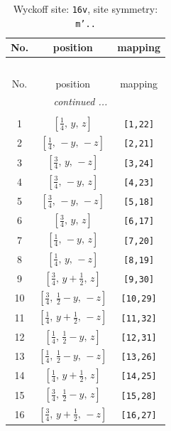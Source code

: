 \documentclass[fleqn,8pt]{jsarticle}
\begin{document}
\renewcommand{\arraystretch}{1.2}
\begin{longtable}{ccc}
\caption{Wyckoff site: {\tt 16v}, site symmetry: {\tt m'..}}
 \\
 \hline \hline
No. & position & mapping \\ \hline \endfirsthead

\multicolumn{2}{l}{\tablename\ \thetable{}} \\
 \hline \hline
No. & position & mapping \\ \hline \endhead

 \hline \hline
\multicolumn{2}{r}{\footnotesize\it continued ...} \\ \endfoot

 \hline \hline
\multicolumn{2}{r}{} \\ \endlastfoot

1 & $\left[ \frac{1}{4},\, y,\, z \right]$ & {\tt [1,22]} \\ \hline
2 & $\left[ \frac{1}{4},\, - y,\, - z \right]$ & {\tt [2,21]} \\ \hline
3 & $\left[ \frac{3}{4},\, y,\, - z \right]$ & {\tt [3,24]} \\ \hline
4 & $\left[ \frac{3}{4},\, - y,\, z \right]$ & {\tt [4,23]} \\ \hline
5 & $\left[ \frac{3}{4},\, - y,\, - z \right]$ & {\tt [5,18]} \\ \hline
6 & $\left[ \frac{3}{4},\, y,\, z \right]$ & {\tt [6,17]} \\ \hline
7 & $\left[ \frac{1}{4},\, - y,\, z \right]$ & {\tt [7,20]} \\ \hline
8 & $\left[ \frac{1}{4},\, y,\, - z \right]$ & {\tt [8,19]} \\ \hline
9 & $\left[ \frac{3}{4},\, y + \frac{1}{2},\, z \right]$ & {\tt [9,30]} \\ \hline
10 & $\left[ \frac{3}{4},\, \frac{1}{2} - y,\, - z \right]$ & {\tt [10,29]} \\ \hline
11 & $\left[ \frac{1}{4},\, y + \frac{1}{2},\, - z \right]$ & {\tt [11,32]} \\ \hline
12 & $\left[ \frac{1}{4},\, \frac{1}{2} - y,\, z \right]$ & {\tt [12,31]} \\ \hline
13 & $\left[ \frac{1}{4},\, \frac{1}{2} - y,\, - z \right]$ & {\tt [13,26]} \\ \hline
14 & $\left[ \frac{1}{4},\, y + \frac{1}{2},\, z \right]$ & {\tt [14,25]} \\ \hline
15 & $\left[ \frac{3}{4},\, \frac{1}{2} - y,\, z \right]$ & {\tt [15,28]} \\ \hline
16 & $\left[ \frac{3}{4},\, y + \frac{1}{2},\, - z \right]$ & {\tt [16,27]} \\
\end{longtable}
\end{document}
